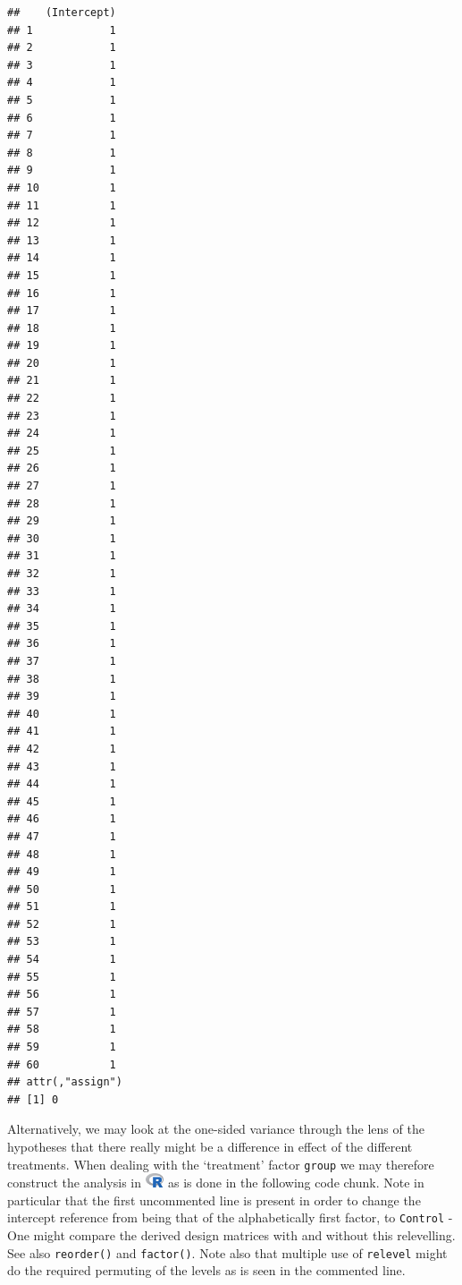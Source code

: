 \documentclass[
]{article}
\newenvironment{Shaded}{\begin{snugshade}}{\end{snugshade}}
\newcommand{\CommentTok}[1]{\textcolor[rgb]{0.56,0.35,0.01}{\textit{#1}}}
\newcommand{\DataTypeTok}[1]{\textcolor[rgb]{0.13,0.29,0.53}{#1}}
\newcommand{\KeywordTok}[1]{\textcolor[rgb]{0.13,0.29,0.53}{\textbf{#1}}}
\newcommand{\NormalTok}[1]{#1}
\newcommand{\OperatorTok}[1]{\textcolor[rgb]{0.81,0.36,0.00}{\textbf{#1}}}
\newcommand{\StringTok}[1]{\textcolor[rgb]{0.31,0.60,0.02}{#1}}
\begin{document}
\begin{verbatim}
##    (Intercept)
## 1            1
## 2            1
## 3            1
## 4            1
## 5            1
## 6            1
## 7            1
## 8            1
## 9            1
## 10           1
## 11           1
## 12           1
## 13           1
## 14           1
## 15           1
## 16           1
## 17           1
## 18           1
## 19           1
## 20           1
## 21           1
## 22           1
## 23           1
## 24           1
## 25           1
## 26           1
## 27           1
## 28           1
## 29           1
## 30           1
## 31           1
## 32           1
## 33           1
## 34           1
## 35           1
## 36           1
## 37           1
## 38           1
## 39           1
## 40           1
## 41           1
## 42           1
## 43           1
## 44           1
## 45           1
## 46           1
## 47           1
## 48           1
## 49           1
## 50           1
## 51           1
## 52           1
## 53           1
## 54           1
## 55           1
## 56           1
## 57           1
## 58           1
## 59           1
## 60           1
## attr(,"assign")
## [1] 0
\end{verbatim}

Alternatively, we may look at the one-sided variance through the lens of
the hypotheses that there really might be a difference in effect of the
different treatments. When dealing with the `treatment' factor
\texttt{group} we may therefore construct the analysis in
\includegraphics[width=\textwidth,height=0.16667in]{R_logo.png} as is
done in the following code chunk. Note in particular that the first
uncommented line is present in order to change the intercept reference
from being that of the alphabetically first factor, to \texttt{Control}
- One might compare the derived design matrices with and without this
relevelling. See also \texttt{reorder()} and \texttt{factor()}. Note
also that multiple use of \texttt{relevel} might do the required
permuting of the levels as is seen in the commented line.

\begin{Shaded}
\end{Shaded}
\end{document}
